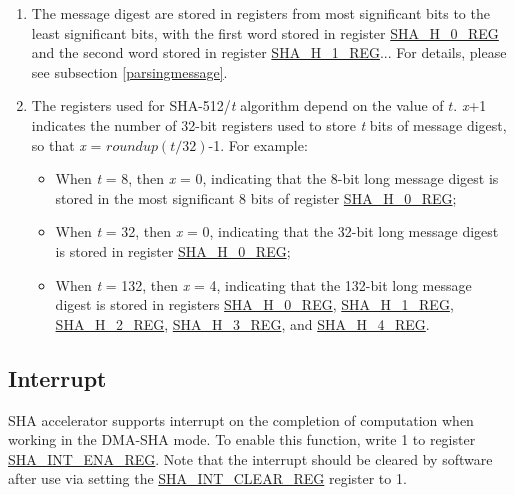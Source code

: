 \documentclass[main\_\_EN.tex]{subfiles}
\begin{document}
\begin{tiplisting}\label{note2}
\vspace{-2.5em}
\begin{enumerate}
\item The message digest are stored in registers from most significant bits to the least significant bits, with the first word stored in register \hyperref[regdesc:SHAHNREG]{SHA\_H\_0\_REG} and the second word stored in register \hyperref[regdesc:SHAHNREG]{SHA\_H\_1\_REG}... For details, please see subsection \ref{parsingmessage}.

\item The registers used for SHA-512/{\it{t}} algorithm depend on the value of \begin{math}t\end{math}. {\it{x}}+1 indicates the number of 32-bit registers used to store {\it{t}} bits of message digest, so that {\it{x}} = \begin{math}roundup(t/32)\end{math}-1. For example:
\begin{itemize}
    \item When {\it{t}} = 8, then {\it{x}} = 0, indicating that the 8-bit long message digest is stored in the most significant 8 bits of register \hyperref[regdesc:SHAHNREG]{SHA\_H\_0\_REG};
    \item When {\it{t}} = 32, then {\it{x}} = 0, indicating that the 32-bit long message digest is stored in register \hyperref[regdesc:SHAHNREG]{SHA\_H\_0\_REG};
    \item When {\it{t}} = 132, then {\it{x}} = 4, indicating that the 132-bit long message digest is stored in registers \hyperref[regdesc:SHAHNREG]{SHA\_H\_0\_REG}, \hyperref[regdesc:SHAHNREG]{SHA\_H\_1\_REG}, \hyperref[regdesc:SHAHNREG]{SHA\_H\_2\_REG}, \hyperref[regdesc:SHAHNREG]{SHA\_H\_3\_REG}, and \hyperref[regdesc:SHAHNREG]{SHA\_H\_4\_REG}.
\end{itemize}
\end{enumerate}
\end{tiplisting}

\subsection{Interrupt}\label{Interrupt}

SHA accelerator supports interrupt on the completion of computation when working in the DMA-SHA mode. To enable this function, write 1 to register \hyperref[regdesc:SHAINTENAREG]{SHA\_INT\_ENA\_REG}. Note that the interrupt should be cleared by software after use via setting the \hyperref[regdesc:SHAINTCLEARREG]{SHA\_INT\_CLEAR\_REG} register to 1.
\end{document}
